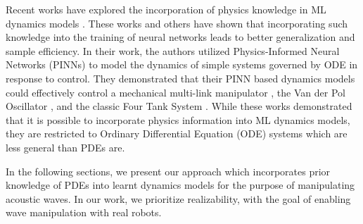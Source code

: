 Recent works have explored the incorporation of physics knowledge in ML dynamics models \cite{nicodemus_2022_physicsinformed, ericaislanantonelo_2022_physicsinformed}. These works and others \cite{mraissi_2019_physicsinformed} have shown that incorporating such knowledge into the training of neural networks leads to better generalization and sample efficiency. In their work, the authors utilized Physics-Informed Neural Networks (PINNs) \cite{mraissi_2019_physicsinformed} to model the dynamics of simple systems governed by ODE in response to control. They demonstrated that their PINN based dynamics models could effectively control a mechanical multi-link manipulator \cite{nicodemus_2022_physicsinformed}, the Van der Pol Oscillator \cite{ericaislanantonelo_2022_physicsinformed}, and the classic Four Tank System \cite{ericaislanantonelo_2022_physicsinformed}. While these works demonstrated that it is possible to incorporate physics information into ML dynamics models, they are restricted to Ordinary Differential Equation (ODE) systems which are less general than PDEs are.

In the following sections, we present our approach which incorporates prior knowledge of PDEs into learnt dynamics models for the purpose of manipulating acoustic waves. In our work, we prioritize realizability, with the goal of enabling wave manipulation with real robots.